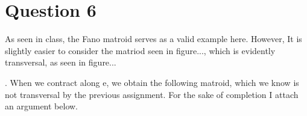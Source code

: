 \documentclass{article}
\begin{document}
\section*{Question 6}
As seen in class, the Fano matroid serves as a valid example here. 
However, It is slightly easier to consider the matriod seen in figure..., which is evidently transversal, as seen in figure...

. When we contract along e, we obtain the following matroid, which we know is 
not transversal by the previous assignment. For the sake of completion I attach an argument below.
\end{document}
